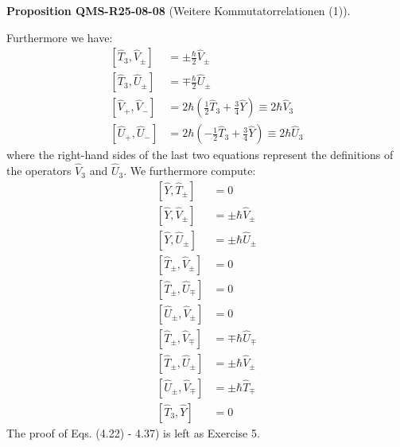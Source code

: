 \documentclass[10pt, letterpaper]{article}
\newcommand{\CustomHeading}[3]{%
  \par\medskip\noindent%
  \textbf{#1 #2} \textnormal{(#3)}.\enskip%
}
\newenvironment{PROP}[2]{\begin{unitbox}\CustomHeading{Proposition}{#1}{#2}}{\end{unitbox}}
\begin{document}
\begin{PROP}{QMS-R25-08-08}{Weitere Kommutatorrelationen (1)}
Furthermore we have:
$$
\begin{aligned}
{\left[\hat{T}_{3}, \hat{V}_{ \pm}\right] } & = \pm \frac{\hbar}{2} \hat{V}_{ \pm} \\
{\left[\hat{T}_{3}, \hat{U}_{ \pm}\right] } & =\mp \frac{\hbar}{2} \hat{U}_{ \pm} \\
{\left[\hat{V}_{+}, \hat{V}_{-}\right] } & =2 \hbar\left(\frac{1}{2} \hat{T}_{3}+\frac{3}{4} \hat{Y}\right) \equiv 2 \hbar \hat{V}_{3} \\
{\left[\hat{U}_{+}, \hat{U}_{-}\right] } & =2 \hbar\left(-\frac{1}{2} \hat{T}_{3}+\frac{3}{4} \hat{Y}\right) \equiv 2 \hbar \hat{U}_{3}
\end{aligned}
$$
where the right-hand sides of the last two equations represent the definitions of the operators $\hat{V}_{3}$ and $\hat{U}_{3}$. We furthermore compute:
$$
\begin{aligned}
{\left[\hat{Y}, \hat{T}_{ \pm}\right] } & =0 \\
{\left[\hat{Y}, \hat{V}_{ \pm}\right] } & = \pm \hbar \hat{V}_{ \pm} \\
{\left[\hat{Y}, \hat{U}_{ \pm}\right] } & = \pm \hbar \hat{U}_{ \pm} \\
{\left[\hat{T}_{ \pm}, \hat{V}_{ \pm}\right] } & =0 \\
{\left[\hat{T}_{ \pm}, \hat{U}_{\mp}\right] } & =0 \\
{\left[\hat{U}_{ \pm}, \hat{V}_{ \pm}\right] } & =0 \\
{\left[\hat{T}_{ \pm}, \hat{V}_{\mp}\right] } & =\mp \hbar \hat{U}_{\mp} \\
{\left[\hat{T}_{ \pm}, \hat{U}_{ \pm}\right] } & = \pm \hbar \hat{V}_{ \pm} \\
{\left[\hat{U}_{ \pm}, \hat{V}_{\mp}\right] } & = \pm \hbar \hat{T}_{\mp} \\
{\left[\hat{T}_{3}, \hat{Y}\right] } & =0
\end{aligned}
$$
The proof of Eqs. (4.22) - 4.37) is left as Exercise 5.
\end{PROP}
\end{document}
